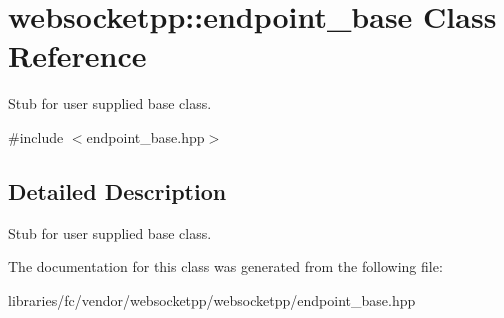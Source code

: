 \hypertarget{classwebsocketpp_1_1endpoint__base}{}\section{websocketpp\+:\+:endpoint\+\_\+base Class Reference}
\label{classwebsocketpp_1_1endpoint__base}


Stub for user supplied base class.  




{\ttfamily \#include $<$endpoint\+\_\+base.\+hpp$>$}



\subsection{Detailed Description}
Stub for user supplied base class. 

The documentation for this class was generated from the following file\+:\begin{DoxyCompactItemize}
\item 
libraries/fc/vendor/websocketpp/websocketpp/endpoint\+\_\+base.\+hpp\end{DoxyCompactItemize}
